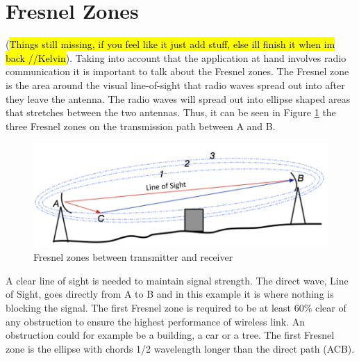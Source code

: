 \newpage

\section{Fresnel Zones}\label{sec:fresnel}
(\hl{Things still missing, if you feel like it just add stuff, else ill finish it when im back //Kelvin}).
Taking into account that the application at hand involves radio communication it is important to talk about the Fresnel zones. The Fresnel zone is the area around the visual line-of-sight that radio waves spread out into after they leave the antenna. The radio waves will spread out into ellipse shaped areas that stretches between the two antennas. Thus, it can be seen in Figure \ref{fig:fresnel_zones} the three Fresnel zones on the transmission path between A and B. 

\begin{figure}[h]
	\centering
	\includegraphics[scale=0.65]{figures/fresnel_zones.png}
	\caption{Fresnel zones between transmitter and receiver}
	\label{fig:fresnel_zones}
\end{figure}

A clear line of sight is needed to maintain signal strength.%
The direct wave, Line of Sight, goes directly from A to B and in this example it is where nothing is blocking the signal. The first Fresnel zone is required to be at least 60$\%$ clear of any obstruction to ensure the highest performance of wireless link. An obstruction could for example be a building, a car or a tree. The first Fresnel zone is the ellipse with chords 1/2 wavelength longer than the direct path (ACB). 

